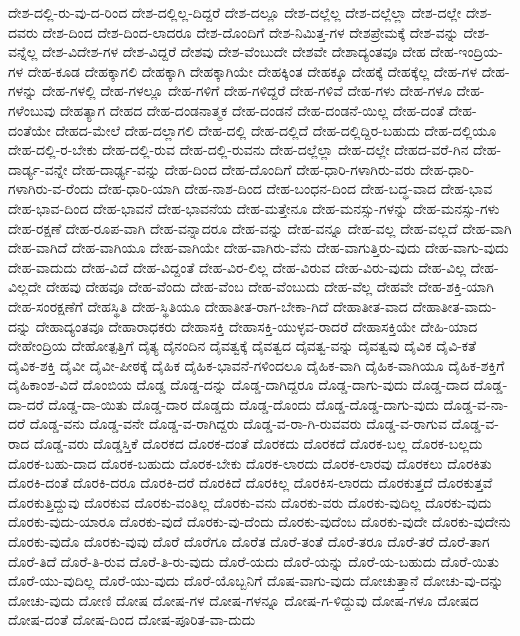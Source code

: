 {ದೇಶ-ದಲ್ಲಿ-ರು-ವು-ದ-ರಿಂದ
ದೇಶ-ದಲ್ಲಿಲ್ಲ-ದಿದ್ದರೆ
ದೇಶ-ದಲ್ಲೂ
ದೇಶ-ದಲ್ಲೆಲ್ಲ
ದೇಶ-ದಲ್ಲೆಲ್ಲಾ
ದೇಶ-ದಲ್ಲೇ
ದೇಶ-ದವರು
ದೇಶ-ದಿಂದ
ದೇಶ-ದಿಂದ-ಲಾದರೂ
ದೇಶ-ದೊಂದಿಗೆ
ದೇಶ-ನಿಮಿತ್ತ-ಗಳ
ದೇಶಪ್ರೇಮಕ್ಕೆ
ದೇಶ-ವನ್ನು
ದೇಶ-ವನ್ನೆಲ್ಲ
ದೇಶ-ವಿದೇಶ-ಗಳ
ದೇಶ-ವಿದ್ದರೆ
ದೇಶವು
ದೇಶ-ವೆಂಬುದೇ
ದೇಶವೇ
ದೇಶಾದ್ಯಂತವೂ
ದೇಹ
ದೇಹ-ಇಂದ್ರಿಯ-ಗಳ
ದೇಹ-ಕೂಡ
ದೇಹಕ್ಕಾಗಲಿ
ದೇಹಕ್ಕಾಗಿ
ದೇಹಕ್ಕಾಗಿಯೇ
ದೇಹಕ್ಕಿಂತ
ದೇಹಕ್ಕೂ
ದೇಹಕ್ಕೆ
ದೇಹಕ್ಕೆಲ್ಲ
ದೇಹ-ಗಳ
ದೇಹ-ಗಳನ್ನು
ದೇಹ-ಗಳಲ್ಲಿ
ದೇಹ-ಗಳಲ್ಲೂ
ದೇಹ-ಗಳಿಗೆ
ದೇಹ-ಗಳಿದ್ದರೆ
ದೇಹ-ಗಳಿವೆ
ದೇಹ-ಗಳು
ದೇಹ-ಗಳೂ
ದೇಹ-ಗಳೆಂಬುವು
ದೇಹತ್ಯಾಗ
ದೇಹದ
ದೇಹ-ದಂಡನಾತ್ಮಕ
ದೇಹ-ದಂಡನೆ
ದೇಹ-ದಂಡನೆ-ಯಿಲ್ಲ
ದೇಹ-ದಂತೆ
ದೇಹ-ದಂತೆಯೇ
ದೇಹದ-ಮೇಲೆ
ದೇಹ-ದಲ್ಲಾಗಲಿ
ದೇಹ-ದಲ್ಲಿ
ದೇಹ-ದಲ್ಲಿದೆ
ದೇಹ-ದಲ್ಲಿದ್ದಿರ-ಬಹುದು
ದೇಹ-ದಲ್ಲಿಯೂ
ದೇಹ-ದಲ್ಲಿ-ರ-ಬೇಕು
ದೇಹ-ದಲ್ಲಿ-ರುವ
ದೇಹ-ದಲ್ಲಿ-ರುವನು
ದೇಹ-ದಲ್ಲೆಲ್ಲಾ
ದೇಹ-ದಲ್ಲೇ
ದೇಹದ-ವರೆ-ಗಿನ
ದೇಹ-ದಾರ್ಡ್ಯ-ವನ್ನೇ
ದೇಹ-ದಾರ್ಢ್ಯ-ವನ್ನು
ದೇಹ-ದಿಂದ
ದೇಹ-ದೊಂದಿಗೆ
ದೇಹ-ಧಾರಿ-ಗಳಾಗಿರು-ವರು
ದೇಹ-ಧಾರಿ-ಗಳಾಗಿರು-ವ-ರೆಂದು
ದೇಹ-ಧಾರಿ-ಯಾಗಿ
ದೇಹ-ನಾಶ-ದಿಂದ
ದೇಹ-ಬಂಧನ-ದಿಂದ
ದೇಹ-ಬದ್ಧ-ವಾದ
ದೇಹ-ಭಾವ
ದೇಹ-ಭಾವ-ದಿಂದ
ದೇಹ-ಭಾವನೆ
ದೇಹ-ಭಾವನೆಯ
ದೇಹ-ಮತ್ತೇನೂ
ದೇಹ-ಮನಸ್ಸು-ಗಳನ್ನು
ದೇಹ-ಮನಸ್ಸು-ಗಳು
ದೇಹ-ರಕ್ಷಣೆ
ದೇಹ-ರೂಪ-ವಾಗಿ
ದೇಹ-ವನ್ನಾದರೂ
ದೇಹ-ವನ್ನು
ದೇಹ-ವನ್ನೂ
ದೇಹ-ವಲ್ಲ
ದೇಹ-ವಲ್ಲದೆ
ದೇಹ-ವಾಗಿ
ದೇಹ-ವಾಗಿದೆ
ದೇಹ-ವಾಗಿಯೂ
ದೇಹ-ವಾಗಿಯೇ
ದೇಹ-ವಾಗಿರು-ವೆನು
ದೇಹ-ವಾಗುತ್ತಿರು-ವುದು
ದೇಹ-ವಾಗು-ವುದು
ದೇಹ-ವಾದುದು
ದೇಹ-ವಿದೆ
ದೇಹ-ವಿದ್ದಂತೆ
ದೇಹ-ವಿರ-ಲಿಲ್ಲ
ದೇಹ-ವಿರುವ
ದೇಹ-ವಿರು-ವುದು
ದೇಹ-ವಿಲ್ಲ
ದೇಹ-ವಿಲ್ಲದೇ
ದೇಹವು
ದೇಹವೂ
ದೇಹ-ವೆಂದು
ದೇಹ-ವೆಂಬ
ದೇಹ-ವೆಂಬುದು
ದೇಹ-ವೆಲ್ಲ
ದೇಹವೇ
ದೇಹ-ಶಕ್ತಿ-ಯಾಗಿ
ದೇಹ-ಸಂರಕ್ಷಣೆಗೆ
ದೇಹಸ್ಥಿತಿ
ದೇಹ-ಸ್ಥಿತಿಯೂ
ದೇಹಾತೀತ-ರಾಗ-ಬೇಕಾ-ಗಿದೆ
ದೇಹಾತೀತ-ವಾದ
ದೇಹಾತೀತ-ವಾದು-ದನ್ನು
ದೇಹಾದ್ಯಂತವೂ
ದೇಹಾರಾಧಕರು
ದೇಹಾಸಕ್ತಿ
ದೇಹಾಸಕ್ತಿ-ಯುಳ್ಳವ-ರಾದರೆ
ದೇಹಾಸಕ್ತಿಯೇ
ದೇಹಿ-ಯಾದ
ದೇಹೇಂದ್ರಿಯ
ದೇಹೋತ್ಪತ್ತಿಗೆ
ದೈತ್ಯ
ದೈನಂದಿನ
ದೈವತ್ವಕ್ಕೆ
ದೈವತ್ವದ
ದೈವತ್ವ-ವನ್ನು
ದೈವತ್ವವು
ದೈವಿಕ
ದೈವಿ-ಕತೆ
ದೈವಿಕ-ಶಕ್ತಿ
ದೈವೀ
ದೈವೀ-ಪೀಠಕ್ಕೆ
ದೈಹಿಕ
ದೈಹಿಕ-ಭಾವನೆ-ಗಳಿಂದಲೂ
ದೈಹಿಕ-ವಾಗಿ
ದೈಹಿಕ-ವಾಗಿಯೂ
ದೈಹಿಕ-ಶಕ್ತಿಗೆ
ದೈಹಿಕಾಂಶ-ವಿದೆ
ದೊಂಬಿಯ
ದೊಡ್ಡ
ದೊಡ್ಡ-ದನ್ನು
ದೊಡ್ಡ-ದಾಗಿದ್ದರೂ
ದೊಡ್ಡ-ದಾಗು-ವುದು
ದೊಡ್ಡ-ದಾದ
ದೊಡ್ಡ-ದಾ-ದರೆ
ದೊಡ್ಡ-ದಾ-ಯಿತು
ದೊಡ್ಡ-ದಾರ
ದೊಡ್ಡದು
ದೊಡ್ಡ-ದೊಂದು
ದೊಡ್ಡ-ದೊಡ್ಡ-ದಾಗು-ವುದು
ದೊಡ್ಡ-ವ-ನಾ-ದರೆ
ದೊಡ್ಡ-ವನು
ದೊಡ್ಡ-ವನೇ
ದೊಡ್ಡ-ವ-ರಾಗಿದ್ದರು
ದೊಡ್ಡ-ವ-ರಾ-ಗಿ-ರುವವರು
ದೊಡ್ಡ-ವ-ರಾಗುವ
ದೊಡ್ಡ-ವ-ರಾದ
ದೊಡ್ಡ-ವರು
ದೊಡ್ಡಸ್ತಿಕೆ
ದೊರಕದ
ದೊರಕ-ದಂತೆ
ದೊರಕದು
ದೊರಕದೆ
ದೊರಕ-ಬಲ್ಲ
ದೊರಕ-ಬಲ್ಲದು
ದೊರಕ-ಬಹು-ದಾದ
ದೊರಕ-ಬಹುದು
ದೊರಕ-ಬೇಕು
ದೊರಕ-ಲಾರದು
ದೊರಕ-ಲಾರವು
ದೊರಕಲು
ದೊರಕಿತು
ದೊರಕಿ-ದಂತೆ
ದೊರಕಿ-ದರೂ
ದೊರಕಿ-ದರೆ
ದೊರಕಿದೆ
ದೊರಕಿಲ್ಲ
ದೊರಕಿಸ-ಲಾರದು
ದೊರಕುತ್ತದೆ
ದೊರಕುತ್ತವೆ
ದೊರಕುತ್ತಿದ್ದುವು
ದೊರಕುವ
ದೊರಕು-ವಂತಿಲ್ಲ
ದೊರಕು-ವನು
ದೊರಕು-ವರು
ದೊರಕು-ವುದಿಲ್ಲ
ದೊರಕು-ವುದು
ದೊರಕು-ವುದು-ಯಾರೂ
ದೊರಕು-ವುದೆ
ದೊರಕು-ವು-ದೆಂದು
ದೊರಕು-ವುದೆಂಬ
ದೊರಕು-ವುದೇ
ದೊರಕು-ವುದೇನು
ದೊರಕು-ವುದೊ
ದೊರಕು-ವುವು
ದೊರೆ
ದೊರೆಗೂ
ದೊರೆತ
ದೊರೆ-ತಂತೆ
ದೊರೆ-ತರೂ
ದೊರೆ-ತರೆ
ದೊರೆ-ತಾಗ
ದೊರೆ-ತಿದೆ
ದೊರೆ-ತಿ-ರುವ
ದೊರೆ-ತಿ-ರು-ವುದು
ದೊರೆ-ಯದು
ದೊರೆ-ಯನ್ನು
ದೊರೆ-ಯ-ಬಹುದು
ದೊರೆ-ಯಿತು
ದೊರೆ-ಯು-ವುದಿಲ್ಲ
ದೊರೆ-ಯು-ವುದು
ದೊರೆ-ಯೊಬ್ಬನಿಗೆ
ದೊಷ-ವಾಗು-ವುದು
ದೋಚುತ್ತಾನೆ
ದೋಚು-ವು-ದನ್ನು
ದೋಚು-ವುದು
ದೋಣಿ
ದೋಷ
ದೋಷ-ಗಳ
ದೋಷ-ಗಳನ್ನೂ
ದೋಷ-ಗ-ಳಿದ್ದುವು
ದೋಷ-ಗಳೂ
ದೋಷದ
ದೋಷ-ದಂತೆ
ದೋಷ-ದಿಂದ
ದೋಷ-ಪೂರಿತ-ವಾ-ದುದು
}
